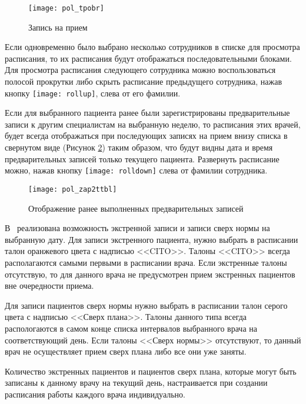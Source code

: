  \begin{figure}[ht]\centering
  \texttt{[image: pol\_tpobr]}
  \caption{Запись на прием}
  \label{img_pol_tpobr}
 \end{figure}

Если одновременно было выбрано несколько сотрудников в списке для просмотра расписания, то их расписания будут отображаться последовательными блоками. Для просмотра расписания следующего сотрудника можно воспользоваться полосой прокрутки либо скрыть расписание предыдущего сотрудника, нажав кнопку \texttt{[image: rollup]}, слева от его фамилии.

Если для выбранного пациента ранее были зарегистрированы предварительные записи к другим специалистам на выбранную неделю, то расписания этих врачей, будет всегда отображаться при последующих записях на прием внизу списка в свернутом виде (Рисунок \ref{img_pol_zap2ttbl}) таким образом, что будут видны дата и время предварительных записей только текущего пациента. Развернуть расписание можно, нажав кнопку \texttt{[image: rolldown]} слева от фамилии сотрудника.

 \begin{figure}[ht]\centering
  \texttt{[image: pol\_zap2ttbl]}
  \caption{Отображение ранее выполненных предварительных записей}
  \label{img_pol_zap2ttbl}
 \end{figure}
     
В \tmis~реализована возможность экстренной записи и записи сверх нормы на выбранную дату. Для записи экстренного пациента, нужно выбрать в расписании талон оранжевого цвета с надписью <<CITO>>. Талоны <<CITO>> всегда располагаются самыми первыми в расписании врача. Если экстренные талоны отсутствую, то для данного врача не предусмотрен прием экстренных пациентов вне очередности приема.

Для записи пациентов сверх нормы нужно выбрать в расписании талон серого цвета с надписью <<Сверх плана>>. Талоны данного типа всегда распологаются в самом конце списка интервалов выбранного врача на соответствующий день. Если талоны <<Сверх нормы>> отсутствуют, то данный врач не осуществляет прием сверх плана либо все они уже заняты. 

\begin{prim}
Количество экстренных пациентов и пациентов сверх плана, которые могут быть записаны к данному врачу на текущий день, настраивается при создании расписания работы каждого врача индивидуально. 
\end{prim}

